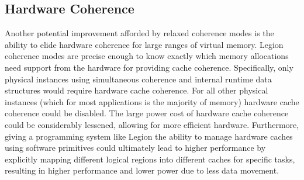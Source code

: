 \subsection{Hardware Coherence}
\label{subsec:hwcoher}
Another potential improvement afforded by relaxed 
coherence modes is the ability to elide hardware coherence
for large ranges of virtual memory. Legion coherence
modes are precise enough to know exactly which memory
allocations need support from the hardware for providing
cache coherence.  Specifically, only physical instances
using simultaneous coherence and internal runtime data
structures would require hardware cache coherence. For
all other physical instances (which for most applications
is the majority of memory) hardware cache coherence 
could be disabled. The large power cost of hardware 
cache coherence could be considerably lessened, allowing
for more efficient hardware. Furthermore, giving a programming
system like Legion the ability to manage hardware caches
using software primitives could ultimately lead to higher
performance by explicitly mapping different logical 
regions into different caches for specific tasks, resulting
in higher performance and lower power due to less data
movement.

